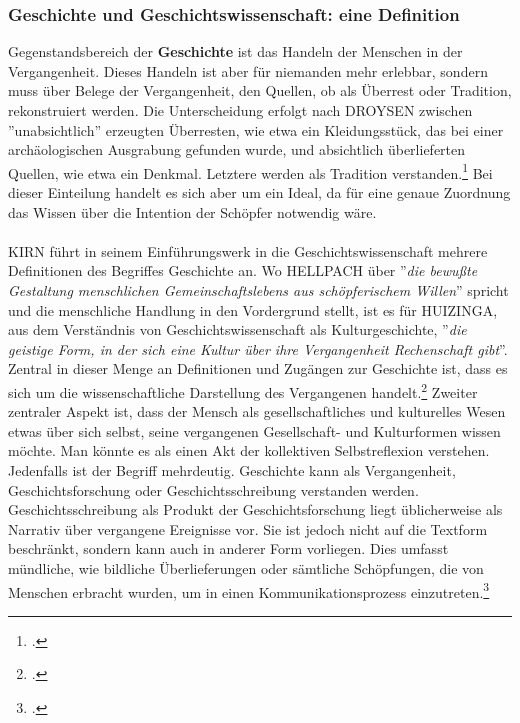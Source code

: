 \documentclass[12pt,a4paper]{article}
\begin{document}
\subsubsection{Geschichte und Geschichtswissenschaft: eine Definition}
Gegenstandsbereich der \textbf{Geschichte} ist das Handeln der Menschen in der Vergangenheit. Dieses Handeln ist aber für niemanden mehr erlebbar, sondern muss über Belege der Vergangenheit, den Quellen, ob als Überrest oder Tradition, rekonstruiert werden. Die Unterscheidung erfolgt nach DROYSEN zwischen ''unabsichtlich'' erzeugten Überresten, wie etwa ein Kleidungsstück, das bei einer archäologischen Ausgrabung gefunden wurde, und absichtlich überlieferten Quellen, wie etwa ein Denkmal. Letztere werden als Tradition verstanden.\footcite[][49–55]{schulz2010neuere} Bei dieser Einteilung handelt es sich aber um ein Ideal, da für eine genaue Zuordnung das Wissen über die Intention der Schöpfer notwendig wäre. 
\\
\\
KIRN führt in seinem Einführungswerk in die Geschichtswissenschaft mehrere Definitionen des Begriffes Geschichte an. Wo HELLPACH über ''\textit{die bewußte Gestaltung menschlichen Gemeinschaftslebens aus schöpferischem Willen}'' spricht und die menschliche Handlung in den Vordergrund stellt, ist es für HUIZINGA, aus dem Verständnis von Geschichtswissenschaft als Kulturgeschichte, ''\textit{die geistige Form, in der sich eine Kultur über ihre Vergangenheit Rechenschaft gibt}''. Zentral in dieser Menge an Definitionen und Zugängen zur Geschichte ist, dass es sich um die wissenschaftliche Darstellung des Vergangenen handelt.\footcite[][S.7-12]{KirnPaul2015EidG} Zweiter zentraler Aspekt ist, dass der Mensch als gesellschaftliches und kulturelles Wesen etwas über sich selbst, seine vergangenen Gesellschaft- und Kulturformen wissen möchte. Man könnte es als einen Akt der kollektiven Selbstreflexion verstehen. Jedenfalls ist der Begriff mehrdeutig. Geschichte kann als Vergangenheit, Geschichtsforschung oder Geschichtsschreibung verstanden werden. Geschichtsschreibung als Produkt der Geschichtsforschung liegt üblicherweise als Narrativ über vergangene Ereignisse vor. Sie ist jedoch nicht auf die Textform beschränkt, sondern kann auch in anderer Form vorliegen. Dies umfasst mündliche, wie bildliche Überlieferungen oder sämtliche Schöpfungen, die von Menschen erbracht wurden, um in einen Kommunikationsprozess einzutreten.\footcite[][S.5-7]{frank2018visualisierungswerkzeuge}
\\
\end{document}
